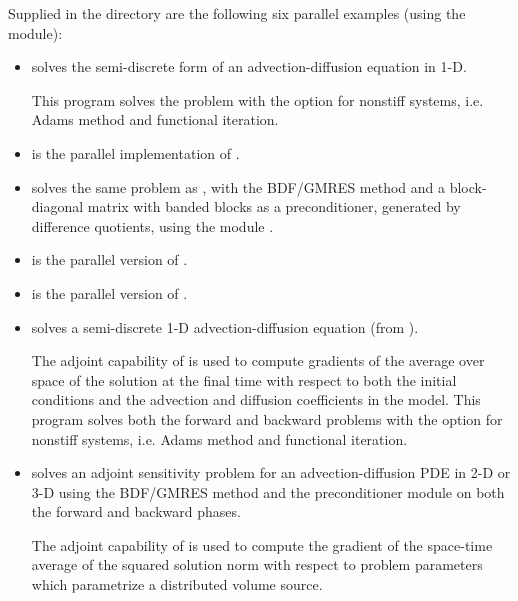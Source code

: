 \vspace{0.2in}
\noindent Supplied in the  directory are
the following six parallel examples (using the {\nvecp} module):
\begin{itemize}

\item {}
  solves the semi-discrete form of an advection-diffusion equation in 1-D.

  This program solves the problem with the option for nonstiff systems,
  i.e. Adams method and functional iteration.

\item {}
  is the parallel implementation of .

\item {}
  solves the same problem as , with the BDF/GMRES method 
  and a block-diagonal matrix with banded blocks as a preconditioner, 
  generated by difference quotients, using the module {\cvbbdpre}.

\item {}
  is the parallel version of .

\item {}
  is the parallel version of .

\item {}
  solves a semi-discrete 1-D advection-diffusion equation (from ).

  The adjoint capability of {\cvodes} is used to compute gradients
  of the average over space of the solution at the final time with
  respect to both the initial conditions and the advection and
  diffusion coefficients in the model.
  This program solves both the forward and backward problems with the option 
  for nonstiff systems, i.e. Adams method and functional iteration.

\item {}
  solves an adjoint sensitivity problem for an advection-diffusion PDE in 2-D 
  or 3-D using the BDF/GMRES method and the {\cvbbdpre} preconditioner module
  on both the forward and backward phases.

  The adjoint capability of {\cvodes} is used to compute the gradient of the
  space-time average of the squared solution norm with respect to problem 
  parameters which parametrize a distributed volume source.

\end{itemize}

